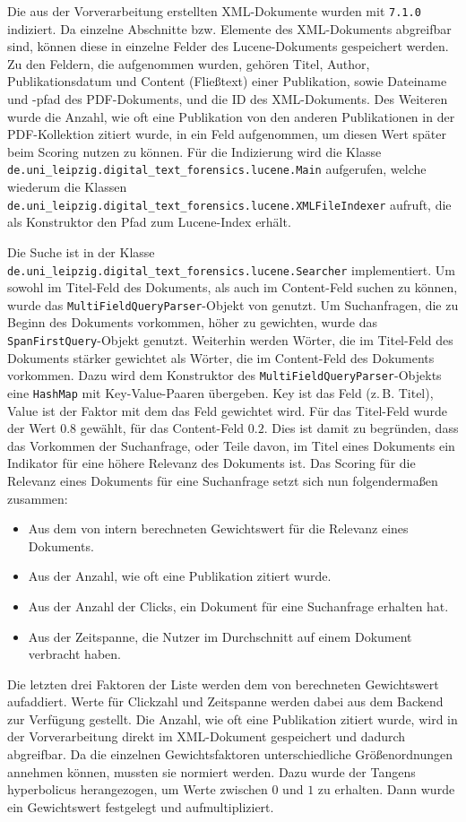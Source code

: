 Die aus der Vorverarbeitung erstellten XML-Dokumente wurden mit \lucene \texttt{7.1.0} indiziert. 
Da einzelne Abschnitte bzw. Elemente des XML-Dokuments abgreifbar sind, können diese in einzelne Felder des Lucene-Dokuments gespeichert werden. 
Zu den Feldern, die aufgenommen wurden, gehören Titel, Author, Publikationsdatum und Content (Fließtext) einer Publikation, sowie Dateiname und -pfad des PDF-Dokuments, und die ID des XML-Dokuments. 
Des Weiteren wurde die Anzahl, wie oft eine Publikation von den anderen Publikationen in der PDF-Kollektion zitiert wurde, in ein Feld aufgenommen, um diesen Wert später beim Scoring nutzen zu können. 
Für die Indizierung wird die Klasse \texttt{de.uni\_leipzig.digital\_text\_forensics.lucene.Main} aufgerufen, welche wiederum die Klassen \texttt{de.uni\_leipzig.digital\_text\_forensics.lucene.XMLFileIndexer} aufruft, die als Konstruktor den Pfad zum Lucene-Index erhält. 

Die Suche ist in der Klasse \texttt{de.uni\_leipzig.digital\_text\_forensics.lucene.Searcher} implementiert. 
Um sowohl im Titel-Feld des Dokuments, als auch im Content-Feld suchen zu können, wurde das \texttt{MultiFieldQueryParser}-Objekt von \lucene genutzt. 
Um Suchanfragen, die zu Beginn des Dokuments vorkommen, höher zu gewichten, wurde das \texttt{SpanFirstQuery}-Objekt genutzt. 
Weiterhin werden Wörter, die im Titel-Feld des Dokuments stärker gewichtet als Wörter, die im Content-Feld des Dokuments vorkommen. 
Dazu wird dem Konstruktor des \texttt{MultiFieldQueryParser}-Objekts eine \texttt{HashMap} mit Key-Value-Paaren übergeben. 
Key ist das Feld (z.\,B. Titel), Value ist der Faktor mit dem das Feld gewichtet wird. 
Für das Titel-Feld wurde der Wert $0.8$ gewählt, für das Content-Feld $0.2$. 
Dies ist damit zu begründen, dass das Vorkommen der Suchanfrage, oder Teile davon, im Titel eines Dokuments ein Indikator für eine höhere Relevanz des Dokuments ist.  
Das Scoring für die Relevanz eines Dokuments für eine Suchanfrage setzt sich nun folgendermaßen zusammen: 
\begin{itemize} 
	\item Aus dem von \lucene intern berechneten Gewichtswert für die Relevanz eines Dokuments. 
	\item Aus der Anzahl, wie oft eine Publikation zitiert wurde. 
	\item Aus der Anzahl der Clicks, ein Dokument für eine Suchanfrage erhalten hat. 
	\item Aus der Zeitspanne, die Nutzer im Durchschnitt auf einem Dokument verbracht haben. 
\end{itemize}
Die letzten drei Faktoren der Liste werden dem von \lucene berechneten Gewichtswert aufaddiert. 
Werte für Clickzahl und Zeitspanne werden dabei aus dem Backend zur Verfügung gestellt. 
Die Anzahl, wie oft eine Publikation zitiert wurde, wird in der Vorverarbeitung direkt im XML-Dokument gespeichert und dadurch abgreifbar. 
Da die einzelnen Gewichtsfaktoren unterschiedliche Größenordnungen annehmen können, mussten sie normiert werden. 
Dazu wurde der Tangens hyperbolicus herangezogen, um Werte zwischen $0$ und $1$ zu erhalten. 
Dann wurde ein Gewichtswert festgelegt und aufmultipliziert. 

